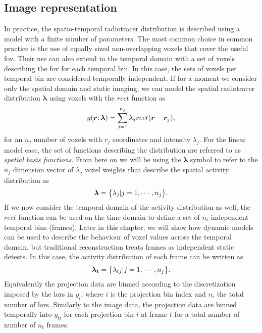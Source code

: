 \subsection{Image representation}
In practice, the spatio-temporal radiotracer distribution is described using a model with a finite number of parameters. The most common choice in common practice is the use of equally sized non-overlapping voxels that cover the useful \gls{fov}. Their use can also extend to the temporal domain with a set of voxels describing the \gls{fov} for each temporal bin. In this case, the sets of voxels per temporal bin are considered temporally independent.
If for a moment we consider only the spatial domain and static imaging, we can model the spatial radiotracer distribution $\bm{\lambda}$ using voxels with the  $rect$ function as
\begin{equation}
   g(\bm{r};\bm\lambda) = \sum_{j=1}^{n_{j}} \lambda_j {rect}(\bm{r}-\bm{r}_j)  \\, 
\end{equation}
for an ${n_{j}}$ number of voxels with $r_j$ coordinates and intensity $\lambda_j$.
For the linear model case, the set of functions describing the distribution are referred to as \textit{spatial basis functions}. From here on we will be using the $\bm\lambda$ symbol to refer to the ${n_{j}}$ dimension vector of $\lambda_j$ voxel weights that describe the spatial activity distribution as 
\begin{equation}
   \bm\lambda = \big\{ \lambda_j| j=1,\cdots,n_j \big\} \\.
\end{equation}
If we now consider the temporal domain of the activity distribution as well, the $rect$ function can be used 
on the time domain to define a set of $n_t$ independent temporal bins (frames). Later in this chapter, we will show how dynamic models can be used to describe the behaviour of voxel values across the temporal domain, but traditional reconstruction treats frames as independent static detests.
In this case, the activity distribution of each frame can be written as
\begin{equation}
   \bm{\lambda_t} = \big\{ {\lambda_{tj}| j=1,\cdots,n_j} \big\} \\.
\end{equation}
Equivalently the projection data are binned according to the discretization imposed by the \glspl{lor} in $y_i$, where $i$ is the projection bin index and $n_i$ the total number of \glspl{lor}. Similarly to the image data, the projection data are binned temporally into $y_{ti}$ for each projection bin $i$ at frame $t$ for a total number of number of $n_t$ frames. 
